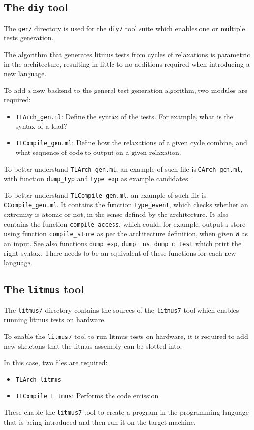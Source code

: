 \subsection{The \texttt{diy} tool}

The \texttt{gen/} directory is used for the \texttt{diy7} tool suite which
enables one or multiple tests generation.

The algorithm that generates litmus tests from cycles of relaxations is
parametric in the architecture, resulting in little to no additions required
when introducing a new language.

To add a new backend to the general test generation algorithm, two modules are required:
\begin{itemize}
\item \texttt{TLArch_gen.ml}: Define the syntax of the tests. For example, what
is the syntax of a load?
\item \texttt{TLCompile_gen.ml}: Define how the relaxations of a given cycle
combine, and what sequence of code to output on a given relaxation.
\end{itemize}

To better understand \texttt{TLArch_gen.ml}, an example of such file is
\texttt{CArch_gen.ml}, with function \texttt{dump_typ} and \texttt{type exp} as
example candidates.

To better understand \texttt{TLCompile_gen.ml}, an example of such file is
\texttt{CCompile_gen.ml}. It contains the function \texttt{type_event}, which
checks whether an extremity is atomic or not, in the sense defined by the
architecture. It also contains the function \texttt{compile_access}, which
could, for example, output a store using function \texttt{compile_store} as per
the architecture definition, when given \texttt{W} as an input. See also
functions \texttt{dump_exp}, \texttt{dump_ins}, \texttt{dump_c_test} which
print the right syntax. There needs to be an equivalent of these functions for
each new language.

\subsection{The \texttt{litmus} tool}

The \texttt{litmus/} directory contains the sources of the \texttt{litmus7}
tool which enables running litmus tests on hardware.

To enable the \texttt{litmus7} tool to run litmus tests on hardware, it is
required to add new skeletons that the litmus assembly can be slotted into.

In this case, two files are required:
\begin{itemize}
\item \texttt{TLArch_litmus}
\item \texttt{TLCompile_Litmus}: Performs the code emission
\end{itemize}

These enable the \texttt{litmus7} tool to create a program in the programming
language that is being introduced and then run it on the target machine.
